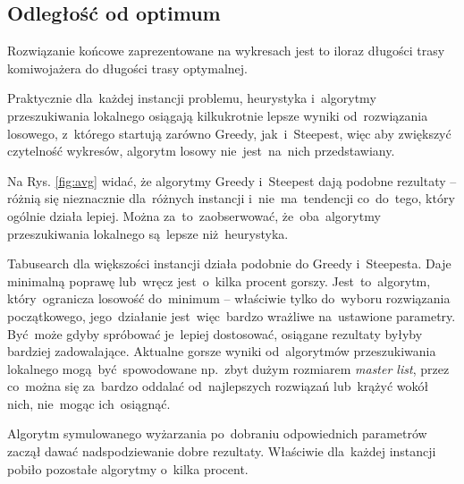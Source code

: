 \subsection{Odległość od optimum}

{\color{part2}
Rozwiązanie końcowe zaprezentowane na wykresach jest to iloraz długości trasy komiwojażera do długości trasy optymalnej.

Praktycznie dla~każdej instancji problemu, heurystyka i~algorytmy przeszukiwania lokalnego osiągają kilkukrotnie lepsze wyniki od~rozwiązania losowego, z~którego startują zarówno Greedy, jak~i~Steepest, więc aby zwiększyć czytelność wykresów, algorytm losowy nie~jest~na~nich przedstawiany.}

Na Rys. \ref{fig:avg} widać, że algorytmy Greedy i~Steepest dają podobne rezultaty -- różnią się nieznacznie dla~różnych instancji i~nie~ma~tendencji co~do~tego, który ogólnie działa lepiej. Można za~to~zaobserwować, że~oba~algorytmy przeszukiwania lokalnego są~lepsze niż~heurystyka.

{\color{part2}
Tabusearch dla większości instancji działa podobnie do Greedy i~Steepesta. Daje minimalną poprawę lub~wręcz jest~o~kilka procent gorszy. Jest~to~algorytm, który~ogranicza losowość do~minimum -- właściwie tylko do~wyboru rozwiązania początkowego, jego~działanie jest~więc~bardzo wrażliwe na~ustawione parametry. Być~może gdyby spróbować je~lepiej dostosować, osiągane rezultaty byłyby bardziej zadowalające. Aktualne gorsze wyniki od~algorytmów przeszukiwania lokalnego mogą~być~spowodowane np.~zbyt dużym rozmiarem \textit{master list}, przez co~można się za~bardzo oddalać od~najlepszych rozwiązań lub~krążyć wokół nich, nie~mogąc ich~osiągnąć.

Algorytm symulowanego wyżarzania po~dobraniu odpowiednich parametrów zaczął dawać nadspodziewanie dobre rezultaty. Właściwie dla~każdej instancji pobiło pozostałe algorytmy o~kilka procent.
}

